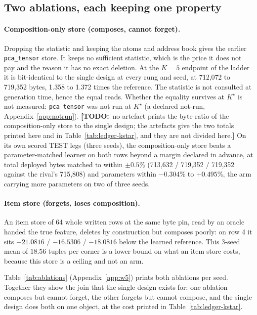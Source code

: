 \documentclass{article} %
\newcommand{\TODO}[1]{{\color{orange}\textbf{[TODO:}~#1\textbf{]}}}
\newcommand{\Kstar}{\ensuremath{K^{\star}}}
\begin{document}
\subsection{Two ablations, each keeping one property}
\label{sec:ablations}

\paragraph{Composition-only store (composes, cannot forget).} Dropping the statistic and keeping the atoms and address book gives the earlier \texttt{pca\_tensor} store. It keeps no
sufficient statistic, which is the price it does not pay and the reason it has no exact
deletion. At the $K=5$ endpoint of the ladder it is bit-identical to the single design at every rung and seed, at 712,072 to 719,352 bytes, 1.358 to 1.372 times the reference.
The statistic is not consulted at generation time, hence the equal reads. Whether the
equality survives at $\Kstar$ is not measured: \texttt{pca\_tensor} was not run at
$\Kstar$ (a declared not-run, Appendix~\ref{app:notrun}). \TODO{no artefact prints the byte ratio of the composition-only store to the single design;
the artefacts give the two totals printed here and in Table~\ref{tab:ledger-kstar}, and they are
not divided here.}
On its own scored TEST legs (three seeds), the composition-only store beats a parameter-matched
learner on both rows beyond a margin declared in advance, at total deployed bytes matched to within $\pm0.5$\% (713,632 / 719,352 / 719,352 against the rival's 715,808) and parameters within $-0.304$\% to $+0.495$\%, the arm carrying more parameters on two of three seeds.

\paragraph{Item store (forgets, loses composition).} An item store of 64 whole written rows at
the same byte pin, read by an oracle handed the true feature, deletes by construction but
composes poorly: on row 4 it sits $-21.0816$ / $-16.5306$ / $-18.0816$ below the learned
reference. This 3-seed mean of 18.56 tuples per corner is a lower bound on what an item store
costs, because this store is a ceiling and not an arm. %

Table~\ref{tab:ablations} (Appendix~\ref{app:w5}) prints both ablations per seed. Together they
show the join that the single design exists for: one ablation composes but cannot forget, the
other forgets but cannot compose, and the single design does both on one object, at the cost
printed in Table~\ref{tab:ledger-kstar}.
\end{document}
